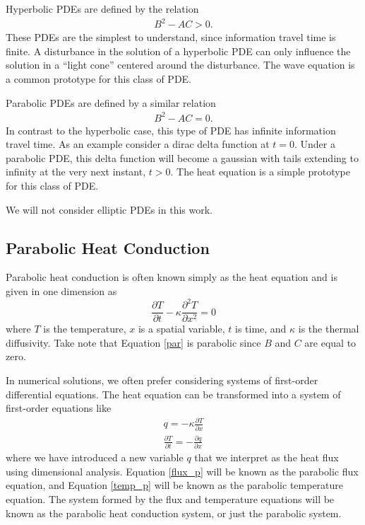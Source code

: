\documentclass[iop]{emulateapj}
\begin{document}
			Hyperbolic \acp{PDE} are defined by the relation 
				\begin{align}
					B^2 - AC > 0.
				\end{align}
				These PDEs are the simplest to understand, since information travel time is finite.
				A disturbance in the solution of a hyperbolic PDE can only influence the solution in a ``light cone'' centered around the disturbance.
				The wave equation is a common prototype for this class of PDE.
				
			Parabolic \acp{PDE} are defined by a similar relation
				\begin{align}
					B^2 - AC = 0.
				\end{align}
				In contrast to the hyperbolic case, this type of PDE has infinite information travel time.
				As an example consider a dirac delta function at $t=0$. 
				Under a parabolic PDE, this delta function will become a gaussian with tails extending to infinity at the very next instant, $t>0$.
				The heat equation is a simple prototype for this class of PDE.
				
			We will not consider elliptic \acp{PDE} in this work.
				
				
				
		\subsection{Parabolic Heat Conduction}
		
			Parabolic heat conduction is often known simply as the heat equation and is given in one dimension as
			\begin{equation} \label{par}
				\frac{\partial T}{\partial t} - \kappa \frac{\partial^2 T}{\partial x^2} = 0
			\end{equation}
			where $T$ is the temperature, $x$ is a spatial variable, $t$ is time, and $\kappa$ is the thermal diffusivity.
			Take note that Equation \ref{par} is parabolic since $B$ and $C$ are equal to zero.
			
			In numerical solutions, we often prefer considering systems of first-order differential equations.
			The heat equation can be transformed into a system of first-order equations like
			\begin{gather}
				q = -\kappa \frac{\partial T}{\partial x} \label{flux_p} \\
				\frac{\partial T}{\partial t} = -\frac{\partial q}{\partial x} \label{temp_p} 
			\end{gather}
			where we have introduced a new variable $q$ that we interpret as the heat flux using dimensional analysis.
			Equation \ref{flux_p} will be known as the parabolic flux equation, and Equation \ref{temp_p} will be known as the parabolic temperature equation.
			The system formed by the flux and temperature equations will be known as the parabolic heat conduction system, or just the parabolic system.
			
\end{document}
